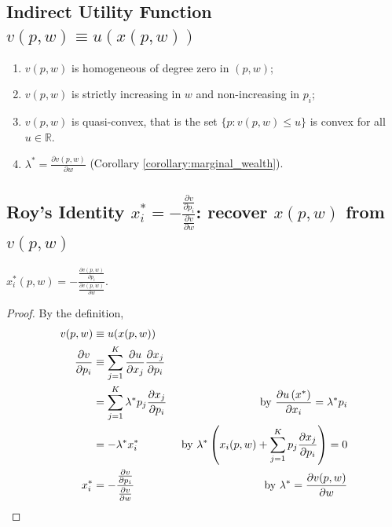 \documentclass[11pt]{elegantbook}
\begin{document}
\subsection{Indirect Utility Function $v(p, w) \equiv u(x(p, w))$}
\begin{proposition}
    \begin{enumerate}
        \item $v(p,w)$ is homogeneous of degree zero in $(p, w)$;
        \item $v(p,w)$ is strictly increasing in $w$ and non-increasing in $p_{i}$;
        \item $v(p,w)$ is quasi-convex, that is the set $\{p:v(p,w)\leq u\}$ is convex for all $u\in \mathbb{R}$.
        \item $\lambda^{*}=\frac{\partial v(p, w)}{\partial w}$ (Corollary \ref{corollary:marginal_wealth}).
    \end{enumerate}
\end{proposition}

\subsection{Roy's Identity $x^*_i=-\frac{\frac{\partial v}{\partial p_{i}}}{\frac{\partial v}{\partial w}}$: recover $x(p, w)$ from $v(p, w)$}
\begin{proposition}
    $x^*_i(p,w)=-\frac{\frac{\partial v(p,w)}{\partial p_{i}}}{\frac{\partial v(p,w)}{\partial w}}$.
\end{proposition}
\begin{proof}
    By the definition,
    \begin{equation}
        \begin{aligned}
            v(p, w) & \equiv u(x(p, w))&\\
            \frac{\partial v}{\partial p_{i}} & \equiv \sum_{j=1}^{K} \frac{\partial u}{\partial x_{j}} \frac{\partial x_{j}}{\partial p_{i}}&\\
            &=\sum_{j=1}^{K} \lambda^{*} p_{j} \frac{\partial x_{j}}{\partial p_{i}}& \textnormal{ by }\frac{\partial u\left(x^{*}\right)}{\partial x_{i}}=\lambda^{*} p_{i}\\
            &=-\lambda^{*} x_{i}^{*}&\textnormal{ by }\lambda^*\left(x_i(p,w)+\sum_{j=1}^{K} p_{j} \frac{\partial x_{j}}{\partial p_{i}}\right)=0\\
            x^*_i&=-\frac{\frac{\partial v}{\partial p_{i}}}{\frac{\partial v}{\partial w}}&\textnormal{ by }\lambda^{*}=\frac{\partial v(p, w)}{\partial w}
        \end{aligned}
        \nonumber
    \end{equation}
\end{proof}
\end{document}
